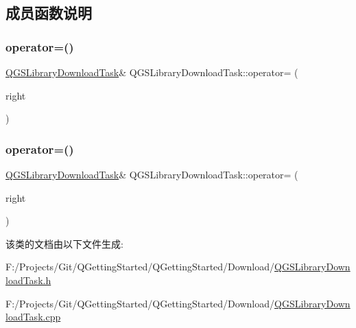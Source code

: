 \subsection{成员函数说明}
\mbox{\label{class_q_g_s_library_download_task_a6052a83db1f2d880278aafaa9c530604}} 
\subsubsection{\texorpdfstring{operator=()}{operator=()}\hspace{0.1cm}{\footnotesize\ttfamily [1/2]}}
{\footnotesize\ttfamily \mbox{\hyperlink{class_q_g_s_library_download_task}{Q\+G\+S\+Library\+Download\+Task}}\& Q\+G\+S\+Library\+Download\+Task\+::operator= (\begin{DoxyParamCaption}\item[{const \mbox{\hyperlink{class_q_g_s_library_download_task}{Q\+G\+S\+Library\+Download\+Task}} \&}]{right }\end{DoxyParamCaption})\hspace{0.3cm}{\ttfamily [delete]}}

\mbox{\label{class_q_g_s_library_download_task_abdeee65f99fa19446bceab84d550a765}} 
\subsubsection{\texorpdfstring{operator=()}{operator=()}\hspace{0.1cm}{\footnotesize\ttfamily [2/2]}}
{\footnotesize\ttfamily \mbox{\hyperlink{class_q_g_s_library_download_task}{Q\+G\+S\+Library\+Download\+Task}}\& Q\+G\+S\+Library\+Download\+Task\+::operator= (\begin{DoxyParamCaption}\item[{\mbox{\hyperlink{class_q_g_s_library_download_task}{Q\+G\+S\+Library\+Download\+Task}} \&\&}]{right }\end{DoxyParamCaption})\hspace{0.3cm}{\ttfamily [delete]}}



该类的文档由以下文件生成\+:\begin{DoxyCompactItemize}
\item 
F\+:/\+Projects/\+Git/\+Q\+Getting\+Started/\+Q\+Getting\+Started/\+Download/\mbox{\hyperlink{_q_g_s_library_download_task_8h}{Q\+G\+S\+Library\+Download\+Task.\+h}}\item 
F\+:/\+Projects/\+Git/\+Q\+Getting\+Started/\+Q\+Getting\+Started/\+Download/\mbox{\hyperlink{_q_g_s_library_download_task_8cpp}{Q\+G\+S\+Library\+Download\+Task.\+cpp}}\end{DoxyCompactItemize}
